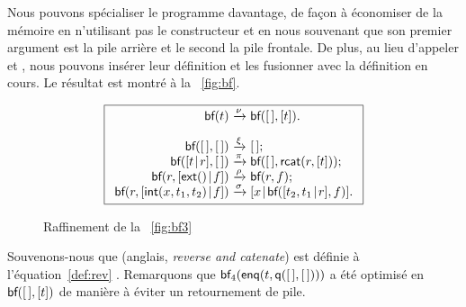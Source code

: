 Nous pouvons spécialiser le programme davantage, de façon à économiser
de la mémoire en n'utilisant pas le constructeur
 et en nous souvenant que son premier
argument est la pile arrière et le second la pile frontale. De plus,
au lieu d'appeler  et
, nous pouvons insérer leur
définition et les fusionner avec la définition en cours. Le résultat
est montré à la \fig~\vref{fig:bf}.
\begin{figure}
\begin{equation*}
\boxed{
\begin{array}{r@{\;}c@{\;}l}
\fun{bf}(t) & \xrightarrow{\smash{\nu}} & \fun{bf}(\el,[t]).\\
\\
\fun{bf}(\el,\el) & \xrightarrow{\smash{\xi}} & \el;\\
\fun{bf}(\cons{t}{r},\el) & \xrightarrow{\smash{\pi}} &
  \fun{bf}(\el,\fun{rcat}(r,[t]));\\
\fun{bf}(r,\cons{\fun{ext}()}{f})
  & \xrightarrow{\smash{\rho}} & \fun{bf}(r,f);\\
\fun{bf}(r,\cons{\fun{int}(x,t_1,t_2)}{f})
  & \xrightarrow{\smash{\sigma}}
  & \cons{x}{\fun{bf}(\cons{t_2,t_1}{r},f)}.
\end{array}}
\end{equation*}
\caption{Raffinement de la \fig~\vref{fig:bf3}\label{fig:bf}}
\end{figure}
Souvenons-nous que  (anglais,
\emph{reverse and catenate}) est définie à l'équation~\eqref{def:rev}
. Remarquons que
\(\textsf{bf}_4(\textsf{enq}(t,\textsf{q}([\,],[\,])))\)
a été optimisé en \(\textsf{bf}([\,],[t])\) de
manière à éviter un retournement de pile.

